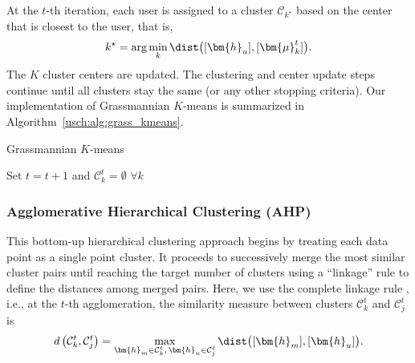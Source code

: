 At the $t$-th iteration, each user is assigned to 
a cluster $\mathcal{C}_{k^\star}$ based on the center that is closest to the user, that is,
\begin{equation}\label{usch:assign}
	k^\star= \arg \mathop {\min }\limits_k \dist \big( [\bm{h}_u] ,[\bm{\mu}_k^t] \big).
\end{equation}
The $K$ cluster centers are updated. 
The clustering and center update steps continue until all clusters stay the same (or any other stopping criteria). 
Our implementation of Grassmannian $K$-means is summarized in Algorithm~\ref{usch:alg:grass_kmeans}.
\begin{algorithm}[htb]
	\caption{Grassmannian $K$-means}
	\label{usch:alg:grass_kmeans}
	\begin{algorithmic}[1]
		\State Set $t=t+1$ and $\mathcal{C}_k^t=\emptyset\,\,\forall k$
		\EndFor
		\EndFor
		\EndWhile
	\end{algorithmic}
\end{algorithm}

\subsubsection{Agglomerative Hierarchical Clustering (AHP)} 
This bottom-up hierarchical clustering approach begins by treating each data point as a single point cluster. 
It proceeds to successively merge the most similar cluster pairs until reaching the target number of clusters using a ``linkage'' rule to define the distances among merged pairs. 
Here, we use the complete linkage rule \cite{Xu14}, i.e., at the $t$-th agglomeration, the similarity measure between clusters ${\mathcal{C}_k^t}$ and ${\mathcal{C}_j^t}$ is 
\begin{align}
	d \left( {{\mathcal{C}_k^t},{\mathcal{C}_j^t}} \right) = \max_{\bm{h}_m\in\mathcal{C}_k^t,\,\bm{h}_u\in\mathcal{C}_j^t} \dist \big( [\bm{h}_m],[\bm{h}_u] \big) .\label{usch:eqn:complete_linkage}
\end{align}


